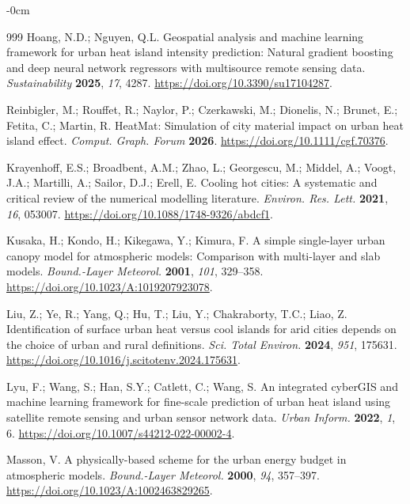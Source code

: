 \documentclass[remotesensing,article,submit,oneauthor]{Definitions/mdpi}
\begin{document}
\begin{adjustwidth}{-\extralength}{0cm}
{\begin{thebibliography}{999}
Hoang, N.D.; Nguyen, Q.L. Geospatial analysis and machine learning
framework for urban heat island intensity prediction: Natural gradient
boosting and deep neural network regressors with multisource remote
sensing data. \textit{Sustainability} \textbf{2025}, \textit{17}, 4287.
\url{https://doi.org/10.3390/su17104287}.

Reinbigler, M.; Rouffet, R.; Naylor, P.; Czerkawski, M.; Dionelis, N.;
Brunet, E.; Fetita, C.; Martin, R. HeatMat: Simulation of city material
impact on urban heat island effect. \textit{Comput. Graph. Forum}
\textbf{2026}. \url{https://doi.org/10.1111/cgf.70376}.

Krayenhoff, E.S.; Broadbent, A.M.; Zhao, L.; Georgescu, M.; Middel, A.;
Voogt, J.A.; Martilli, A.; Sailor, D.J.; Erell, E. Cooling hot cities: A
systematic and critical review of the numerical modelling literature.
\textit{Environ. Res. Lett.} \textbf{2021}, \textit{16}, 053007.
\url{https://doi.org/10.1088/1748-9326/abdcf1}.

Kusaka, H.; Kondo, H.; Kikegawa, Y.; Kimura, F. A simple single-layer
urban canopy model for atmospheric models: Comparison with multi-layer
and slab models. \textit{Bound.-Layer Meteorol.} \textbf{2001},
\textit{101}, 329--358. \url{https://doi.org/10.1023/A:1019207923078}.

Liu, Z.; Ye, R.; Yang, Q.; Hu, T.; Liu, Y.; Chakraborty, T.C.; Liao, Z.
Identification of surface urban heat versus cool islands for arid cities
depends on the choice of urban and rural definitions.
\textit{Sci. Total Environ.} \textbf{2024}, \textit{951}, 175631.
\url{https://doi.org/10.1016/j.scitotenv.2024.175631}.

Lyu, F.; Wang, S.; Han, S.Y.; Catlett, C.; Wang, S. An integrated cyberGIS
and machine learning framework for fine-scale prediction of urban heat
island using satellite remote sensing and urban sensor network data.
\textit{Urban Inform.} \textbf{2022}, \textit{1}, 6.
\url{https://doi.org/10.1007/s44212-022-00002-4}.

Masson, V. A physically-based scheme for the urban energy budget in
atmospheric models. \textit{Bound.-Layer Meteorol.} \textbf{2000},
\textit{94}, 357--397. \url{https://doi.org/10.1023/A:1002463829265}.


\end{thebibliography}}
\end{adjustwidth}
\end{document}
